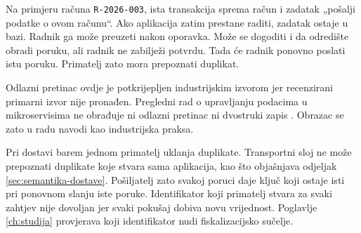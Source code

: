 Na primjeru računa \texttt{R-2026-003}, ista transakcija sprema račun i
zadatak „pošalji podatke o ovom računu“. Ako aplikacija zatim prestane raditi,
zadatak ostaje u bazi. Radnik ga može preuzeti nakon oporavka. Može se
dogoditi i da odredište obradi poruku, ali radnik ne zabilježi potvrdu. Tada
će radnik ponovno poslati istu poruku. Primatelj zato mora prepoznati
duplikat.

Odlazni pretinac ovdje je potkrijepljen industrijskim izvorom jer
recenzirani primarni izvor nije pronađen. Pregledni rad o upravljanju
podacima u mikroservisima ne obrađuje ni odlazni pretinac ni dvostruki
zapis \cite{laigner2021data}. Obrazac se zato u radu navodi kao
industrijska praksa.

Pri dostavi barem jednom primatelj uklanja duplikate. Transportni sloj ne
može prepoznati duplikate koje stvara sama aplikacija, kao što objašnjava
odjeljak \ref{sec:semantika-dostave}. Pošiljatelj zato svakoj poruci daje
ključ koji ostaje isti pri ponovnom slanju iste poruke. Identifikator koji
primatelj stvara za svaki zahtjev nije dovoljan jer svaki pokušaj dobiva novu
vrijednost. Poglavlje \ref{ch:studija} provjerava koji identifikator nudi
fiskalizacijsko sučelje.
